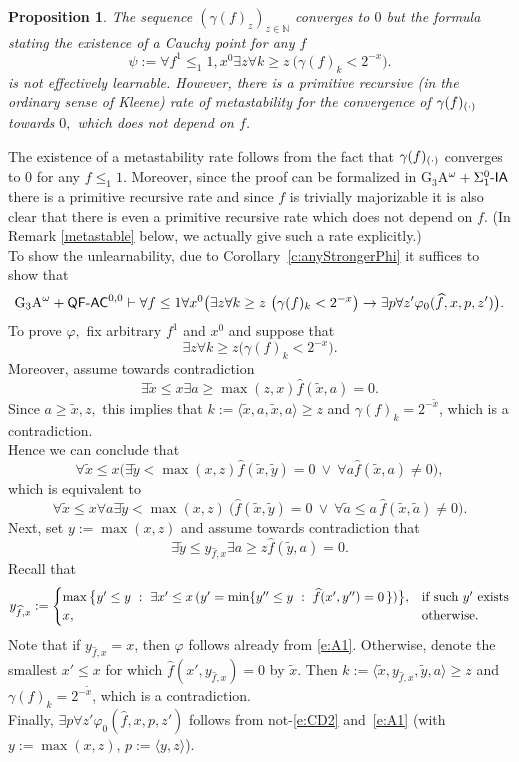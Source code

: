 \documentclass[1p]{elsarticle}
\newcommand{\usftext}[1]{\textsf{\upshape #1}}
\newcommand{\be}[1][{e:\arabic{equation}}] { \begin{equation}\label{#1} }
\newcommand{\ee} { \end{equation} }
\newcommand{\NN}{\ensuremath{\mathbb{N}}}
\newcommand{\IA}{\ensuremath{\usftext{IA}}} %
\newcommand{\QF}{\ensuremath{\usftext{QF}}}
\newcommand{\AC}{\ensuremath{\usftext{AC}}}
\newcommand{\SiLm}{\ensuremath{\Sigma^0_1\usftext{-}}}
\newcommand{\m}{\ensuremath{\usftext{-}}}
\newcommand{\Telse}{\text{otherwise}}
\theoremstyle{plain}
\newtheorem{prop}[thm]{Proposition}
\theoremstyle{definition}
\theoremstyle{remark}
\renewenvironment{proof}[1][]{\noindent{\bf Proof{#1}. }}{\nopagebreak[4]{\hspace*{\fill}
  $\Box$              %
 }{\vspace{2ex}}}
\renewcommand{\phi}{\varphi}
\theoremstyle{definition}
\begin{document}
{\begin{prop}\label{p:gammaf} The sequence $(\gamma(f)_z)_{z\in\NN}$ converges 
to $0$ but
the formula stating the existence of a Cauchy point for any $f$ 
\[
\psi:=\forall f^1\leq_1 1,x^0\exists z \forall k\geq z\ \big( \gamma(f)_k<2^{-x} \big).
\] is not effectively learnable. However, there is
a primitive recursive (in the ordinary sense of Kleene) rate 
of metastability for the convergence of $\gamma(f)_{(\cdot)}$ towards $0,$ 
which does not 
depend on $f$.
\end{prop}
\begin{proof}
The existence of a metastability rate follows from the fact
that $\gamma(f)_{(\cdot)}$ converges to $0$ for any $f\leq_1 1$. Moreover, since the
proof can be formalized in G$_3$A$^\omega+\SiLm\IA$ there is a primitive recursive rate and since $f$ is trivially majorizable it is also
clear that there is even a primitive recursive rate which does not 
depend on $f$. (In Remark \ref{metastable} below, we actually give such a 
rate explicitly.)\\
To show the unlearnability, due to Corollary~\ref{c:anyStrongerPhi} it 
suffices to show that
\[ \mbox{G$_3$A}^\omega+\QF\m\AC^{0,0}\vdash 
\forall f\leq 1 \forall x^0\big( \exists z \forall k\geq z\ \big( \gamma(f)_k<2^{-x} \big)
 \rightarrow \exists p\forall z' \phi_0(\widehat{f},x,p,z') \big).
 \]
To prove $\phi,$ fix arbitrary $f^1$ and $x^0$ and suppose that
\[\exists z\forall k\geq z \big( \gamma(f)_k<2^{-x} \big).\]
Moreover, assume towards contradiction
\be[e:CD]
\exists \tilde x\leq x \exists a\geq\max(z,x) \widehat{f}(\tilde x,a)=0. 
\ee
Since $a\ge \tilde{x},z,$  
this implies that $k:=\langle \tilde x, a, \tilde x, a\rangle \ge z$ 
and $\gamma(f)_k=2^{-\tilde x}$, which is a contradiction.\\
Hence we can conclude that
\[
\forall \tilde x\leq x\big( \exists\tilde y<\max(x,z) \widehat{f}(\tilde x,\tilde y)=0\ \vee\ \forall a \widehat{f}(\tilde x,a)\neq 0\big),
\] 
which is equivalent to
\be[e:A1]
\forall \tilde x\leq x \forall a\exists\tilde y<\max(x,z) \ \big(  
\widehat{f}(\tilde x,\tilde y)=0\ \vee\   \forall \tilde{a}\le a 
\,\widehat{f}(\tilde x,\tilde{a})\neq 0\big).
\ee 
Next, set $y:=\max(x,z)$ and assume towards contradiction that
\be[e:CD2]
 \exists \tilde y\leq y_{\widehat{f}, x} \exists a\geq z \widehat{f}(\tilde y,a)=0. 
\ee
Recall that
\be
y_{\widehat{f}, x}:=\begin{cases}
\max\big\{y'\leq y\ :\ \exists x'\le x\,(
y'=\min\{y''\leq y\ :\ 
\widehat{f}(x',y'')=0\, \})\big\},&\text{if such $y'$ exists}\\
x,&\Telse.
\end{cases}
\ee
Note that if $y_{\widehat{f},x}=x$, then $\phi$ follows already from \eqref{e:A1}. Otherwise, denote the smallest $x'\leq x$ for which
$\widehat{f} (x',y_{\widehat{f},x})=0$ by $\tilde x$. Then $k:=\langle 
\tilde x, y_{\widehat{f}, x}, \tilde y, a\rangle \ge z$ and $\gamma(f)_k=2^{-\tilde x}$, which is a 
contradiction.\\
Finally, $\exists p\forall z' \phi_0(\widehat{f},x,p,z')$ follows from not-\eqref{e:CD2} and~\eqref{e:A1} (with $y:=\max(x,z)$, $p:=\langle y, z\rangle$).
\\
\end{proof}

}
\end{document}
